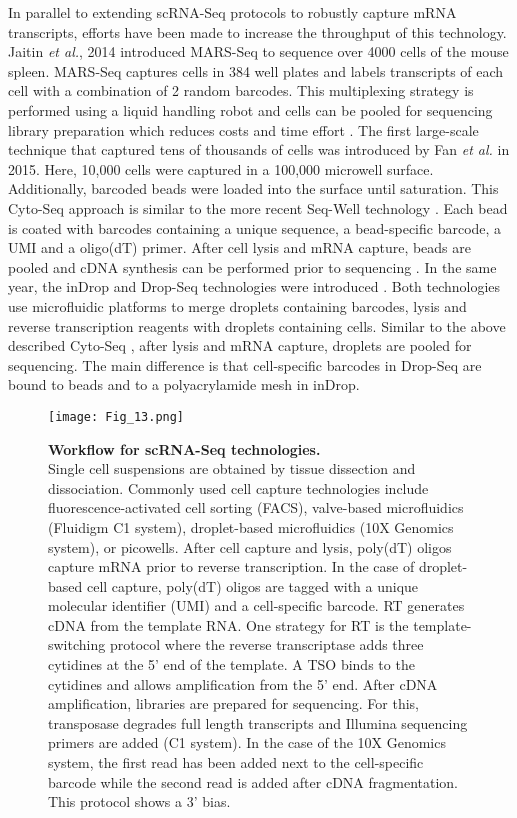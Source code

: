 In parallel to extending scRNA-Seq protocols to robustly capture mRNA transcripts, efforts have been made to increase the throughput of this technology. Jaitin \emph{et al.}, 2014 introduced \gls{MARS-Seq} to sequence over 4000 cells of the mouse spleen. MARS-Seq captures cells in 384 well plates and labels transcripts of each cell with a combination of 2 random barcodes. This multiplexing strategy is performed using a liquid handling robot and cells can be pooled for sequencing library preparation which reduces costs and time effort \citep{Jaitin2014}. The first large-scale technique that captured tens of thousands of cells was introduced by Fan \emph{et al.} in 2015. Here, 10,000 cells were captured in a 100,000 microwell surface. Additionally, barcoded beads were loaded into the surface until saturation. This Cyto-Seq approach is similar to the more recent Seq-Well technology \citep{Gierahn2017}. Each bead is coated with barcodes containing a unique sequence, a bead-specific barcode, a UMI and a oligo(dT) primer. After cell lysis and mRNA capture, beads are pooled and cDNA synthesis can be performed prior to sequencing \citep{Fan2015}. In the same year, the inDrop and Drop-Seq technologies were introduced \citep{Klein2015, Macosko2015}. Both technologies use microfluidic platforms to merge droplets containing barcodes, lysis and reverse transcription reagents with droplets containing cells. Similar to the above described Cyto-Seq \citep{Fan2015}, after lysis and mRNA capture, droplets are pooled for sequencing. The main difference is that cell-specific barcodes in Drop-Seq are bound to beads and to a polyacrylamide mesh in inDrop.  

\begin{figure}[!h]
\centering
\texttt{[image: Fig\_13.png]}
\caption[Workflow for scRNA-Seq technologies]{\textbf{Workflow for scRNA-Seq technologies.}\\
Single cell suspensions are obtained by tissue dissection and dissociation. Commonly used cell capture technologies include fluorescence-activated cell sorting (FACS), valve-based microfluidics (Fluidigm\textsuperscript{\textregistered{}} C1 system), droplet-based microfluidics (10X Genomics\textsuperscript{\textregistered{}} system), or picowells. After cell capture and lysis, poly(dT) oligos capture mRNA prior to reverse transcription. In the case of droplet-based cell capture, poly(dT) oligos are tagged with a unique molecular identifier (UMI) and a cell-specific barcode. \Gls{RT} generates cDNA from the template RNA. One strategy for RT is the template-switching protocol where the reverse transcriptase adds three cytidines at the 5' end of the template. A \gls{TSO} binds to the cytidines and allows amplification from the 5' end. After cDNA amplification, libraries are prepared for sequencing. For this, transposase degrades full length transcripts and Illumina sequencing primers are added (C1 system). In the case of the 10X Genomics system, the first read has been added next to the cell-specific barcode while the second read is added after cDNA fragmentation. This protocol shows a 3' bias.}
\label{fig0:scRNA-Seq}
\end{figure}

